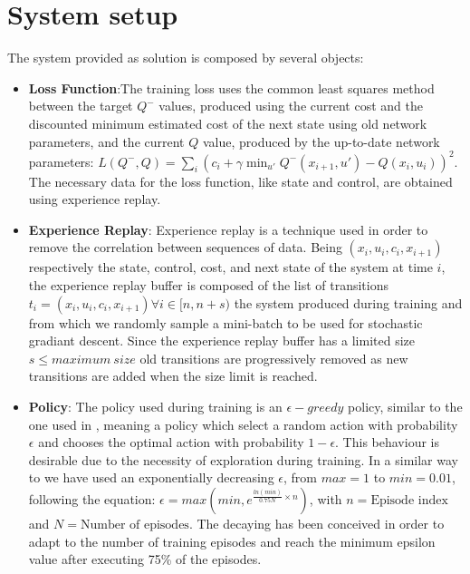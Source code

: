 \documentclass[twocolumn, a4paper]{article}
\begin{document}
\section{System setup}
The system provided as solution is composed by several objects:
\begin{itemize}
	\item \textbf{Loss Function}:The training loss uses the common least
		  squares method between the target \(Q^{-}\) values, produced using
		  the current cost and the discounted minimum estimated cost of the
		  next state using old network parameters, and the current \(Q\) value,
		  produced by the up-to-date network parameters:
		  \(L(Q^{-},Q)=\sum_{i}(c_{i}+\gamma\min_{u'}Q^{-}(x_{i+1},u')-Q(x_{i},
		  u_{i}))^{2}\). The necessary data for the loss function, like state
		  and control, are obtained using experience replay.
	\item \textbf{Experience Replay}: Experience replay is a technique used in
		  order to remove the correlation between sequences of data. Being
		  \((x_{i}, u_{i}, c_{i}, x_{i+1})\) respectively the state, control,
		  cost, and next state of the system at time \(i\), the experience
		  replay buffer is composed of the list of transitions
		  \({t_{i}=(x_{i}, u_{i}, c_{i}, x_{i+1}) \forall i\in [n, n+s)}\)
		  the system produced during training and from which we randomly
		  sample a mini-batch to be used for stochastic gradiant descent.
		  Since the experience replay buffer has a limited size
		  \(s\leq maximum\:size\) old transitions are progressively removed as
		  new transitions are added when the size limit is reached.
	\item \textbf{Policy}: The policy used during training is an
		  \(\epsilon-greedy\) policy, similar to the one used in \cite{Mnih},
		  meaning a policy which select a random action with probability
		  \(\epsilon\) and chooses the optimal action with probability
		  \(1-\epsilon\). This behaviour is desirable due to the necessity of
		  exploration during training. In a similar way to \cite{Mnih} we have
		  used an exponentially decreasing \(\epsilon\), from \(max=1\) to
		  \(min=0.01\), following the equation:
		  \(\epsilon=max(min,e^{\frac{ln(min)}{0.75N}\times n})\), with
		  \(n=\text{Episode index}\) and \(N=\text{Number of episodes}\).
		  The decaying has been conceived in order to adapt to the number of
		  training episodes and reach the minimum epsilon value after executing
		  75\% of the episodes.
\end{itemize}
\end{document}
